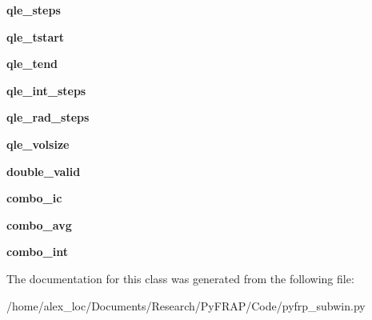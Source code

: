 \begin{DoxyCompactItemize}
\item 
\hypertarget{classpyfrp__subwin_1_1sim__dialog_acf084f7855274495590155d22078dfe7}{{\bfseries qle\+\_\+steps}}\label{classpyfrp__subwin_1_1sim__dialog_acf084f7855274495590155d22078dfe7}

\item 
\hypertarget{classpyfrp__subwin_1_1sim__dialog_aa87a6431e4bb92cdf6bf046ebfc91061}{{\bfseries qle\+\_\+tstart}}\label{classpyfrp__subwin_1_1sim__dialog_aa87a6431e4bb92cdf6bf046ebfc91061}

\item 
\hypertarget{classpyfrp__subwin_1_1sim__dialog_a6fe10da8e4ee56720fb0fca035faa00b}{{\bfseries qle\+\_\+tend}}\label{classpyfrp__subwin_1_1sim__dialog_a6fe10da8e4ee56720fb0fca035faa00b}

\item 
\hypertarget{classpyfrp__subwin_1_1sim__dialog_a778b8c42d8ca2100c335838339b59064}{{\bfseries qle\+\_\+int\+\_\+steps}}\label{classpyfrp__subwin_1_1sim__dialog_a778b8c42d8ca2100c335838339b59064}

\item 
\hypertarget{classpyfrp__subwin_1_1sim__dialog_ab1002e704857e22921d5f70aedd489b0}{{\bfseries qle\+\_\+rad\+\_\+steps}}\label{classpyfrp__subwin_1_1sim__dialog_ab1002e704857e22921d5f70aedd489b0}

\item 
\hypertarget{classpyfrp__subwin_1_1sim__dialog_aff65ccaa602d813b11c19c326662e5bc}{{\bfseries qle\+\_\+volsize}}\label{classpyfrp__subwin_1_1sim__dialog_aff65ccaa602d813b11c19c326662e5bc}

\item 
\hypertarget{classpyfrp__subwin_1_1sim__dialog_a649bfe826ba8a8fda249778044c20d69}{{\bfseries double\+\_\+valid}}\label{classpyfrp__subwin_1_1sim__dialog_a649bfe826ba8a8fda249778044c20d69}

\item 
\hypertarget{classpyfrp__subwin_1_1sim__dialog_ab32bb50bc61b885e0501d85e637c366e}{{\bfseries combo\+\_\+ic}}\label{classpyfrp__subwin_1_1sim__dialog_ab32bb50bc61b885e0501d85e637c366e}

\item 
\hypertarget{classpyfrp__subwin_1_1sim__dialog_aad9df19eb21297a170f854df2a267bab}{{\bfseries combo\+\_\+avg}}\label{classpyfrp__subwin_1_1sim__dialog_aad9df19eb21297a170f854df2a267bab}

\item 
\hypertarget{classpyfrp__subwin_1_1sim__dialog_af1ead9298e7c195842039082a96d69fa}{{\bfseries combo\+\_\+int}}\label{classpyfrp__subwin_1_1sim__dialog_af1ead9298e7c195842039082a96d69fa}

\end{DoxyCompactItemize}


The documentation for this class was generated from the following file\+:\begin{DoxyCompactItemize}
\item 
/home/alex\+\_\+loc/\+Documents/\+Research/\+Py\+F\+R\+A\+P/\+Code/pyfrp\+\_\+subwin.\+py\end{DoxyCompactItemize}
